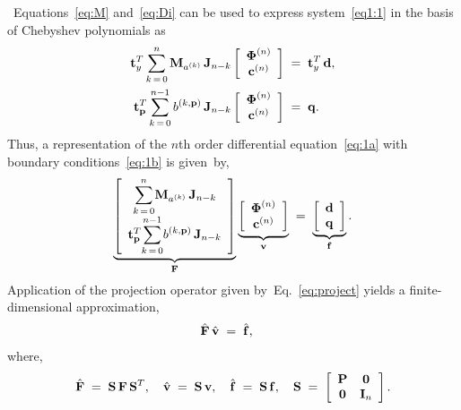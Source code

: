 \documentclass[%
secnumarabic,%
 amssymb, amsmath,%
 aps,prf,superscriptaddress,longbibliography
frontmatterverbose,
]{revtex4-2}
\begin{document}
	\newpage
{}~Equations~\eqref{eq:M}  and~\eqref{eq:Di} can be used to express system~\eqref{eq1:1} in the basis of Chebyshev polynomials as 
\begin{subequations}
\begin{align}
  \mathbf{t}_{y}^T
  \sum_{k \, = \, 0}^{n}
  \mathbf M_{a^{(k)}}
  \,
  \mathbf{J}_{n-k}
  \left[\begin{array}{c}
    \boldsymbol \Phi^{(n)}
    \\ 
    {\mathbf{c}}^{(n)} \end{array}\right] 
    &\;=\; 
    \mathbf{t}_{y}^T\,\mathbf{d},
    \label{eq:nDeq}
	\\[0.cm]
	\label{eq:ndBc}
    \mathbf{t}_{\mathbf{p}}^T\sum_{k \, = \, 0}^{n-1}
    b^{(k,\mathbf p)} 
    \,
    \mathbf{J}_{n-k} 
    \left[\begin{array}{c}
    \boldsymbol \Phi^{(n)}\\
    {\mathbf{c}}^{(n)}
  \end{array}\right]
  &\;=\;
  \mathbf{q}.
  \end{align}
\end{subequations}
Thus, a representation of the $n$th order differential equation~\eqref{eq:1a} with boundary conditions~\eqref{eq:1b} is given~by,
\begin{equation}\label{eq:infiniteDim}
  \underbrace{\left[
  \begin{array}{cc}
    \displaystyle{\sum_{k \, = \, 0}^{n}} \mathbf M_{a^{(k)}} \, \mathbf{J}_{n-k}
    \\[0.35cm]
    \mathbf{t}_{\mathbf{p}}^T
    \displaystyle{\sum_{k \, = \, 0}^{n-1}}b^{(k,\mathbf p)} \, \mathbf{J}_{n-k}
  \end{array}\right]}_{\mathbf{F}}\underbrace{\left[\begin{array}{c}
    \boldsymbol \Phi^{(n)}\\
    {\mathbf{c}}^{(n)}
  \end{array}\right]}_{\mathbf{v}} \;=\;\underbrace{\left[\begin{array}{c}
    \mathbf{d}\\
    \mathbf q
  \end{array}\right]}_{\mathbf{f}}.
\end{equation} 
Application of the projection operator given by~Eq.~\eqref{eq:project} yields a finite-dimensional approximation,
\begin{align}\label{eq:nDFinal}
    \hat{\mathbf{F}} \,\hat{\mathbf{v}}\;&=\; \hat{\mathbf{f}},
  \end{align}
 where,
  \begin{equation}\label{eq:Sn}
    \hat{\mathbf{F}} 
    \;=\;  
    \mathbf{S} \,\mathbf{F} \,\mathbf{S}^T, 
    \quad
    \hat{\mathbf{v}} 
    \;=\; 
    \mathbf{S} \, \mathbf{v}, 
    \quad \hat{\mathbf{f}} 
    \;=\; 
    \mathbf{S} \, \mathbf{f}, 
    \quad \mathbf{S} 
    \;=\; 
    \left[\begin{array}{cc}
    \mathbf{P} & \mathbf 0 \\
    \mathbf 0 & \mathbf{I}_n
    \end{array}\right] .
  \end{equation}
\end{document}
